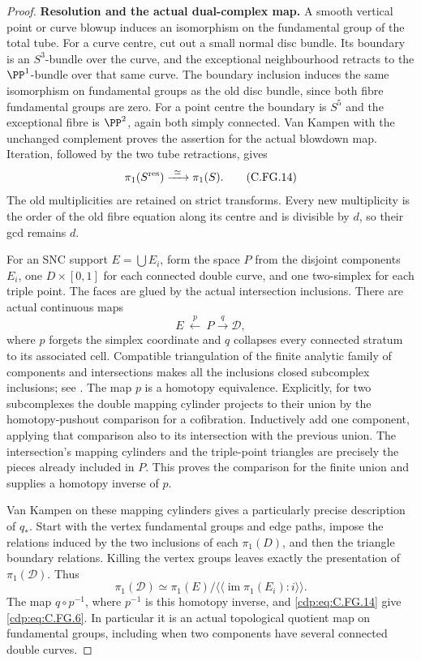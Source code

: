 \begin{proof}
\par\medskip\noindent\textbf{Resolution and the actual dual-complex map.}
A smooth vertical point or curve blowup induces an isomorphism on
the fundamental group of the total tube. For a curve centre, cut
out a small normal disc bundle. Its boundary is an $S^3$-bundle
over the curve, and the exceptional neighbourhood retracts to the
$\PP^1$-bundle over that same curve. The boundary inclusion
induces the same isomorphism on fundamental groups as the old
disc bundle, since both fibre fundamental groups are zero. For
a point centre the boundary is $S^5$ and the exceptional fibre
is $\PP^2$, again both simply connected. Van Kampen with the
unchanged complement proves the assertion for the actual blowdown
map. Iteration, followed by the two tube retractions, gives
\[
              \pi_1(S^{\rm res})\xrightarrow{\ \simeq\ }\pi_1(S).
                                                        \tag{C.FG.14}\label{cdp:eq:C.FG.14}
\]
The old multiplicities are retained on strict transforms. Every
new multiplicity is the order of the old fibre equation along its
centre and is divisible by $d$, so their gcd remains $d$.

For an SNC support $E=\bigcup E_i$, form the space $P$ from the
disjoint components $E_i$, one $D\times[0,1]$ for each connected
double curve, and one two-simplex for each triple point. The faces
are glued by the actual intersection inclusions. There are actual
continuous maps
\[
                   E\ \xleftarrow{\ p\ }\ P
                       \xrightarrow{\ q\ }\mathcal D,             
                                                        \tag{C.FG.15}\label{cdp:eq:C.FG.15}
\]
where $p$ forgets the simplex coordinate and $q$ collapses every
connected stratum to its associated cell. Compatible triangulation
of the finite analytic family of components and intersections makes
all the inclusions closed subcomplex inclusions; see
\cite[\S3, Theorem~2]{Lojasiewicz1964}. The map $p$ is a homotopy
equivalence. Explicitly, for two subcomplexes the double mapping
cylinder projects to their union by the homotopy-pushout comparison
for a cofibration. Inductively add one component, applying that
comparison also to its intersection with the previous union.
The intersection's mapping cylinders and the triple-point
triangles are precisely the pieces already included in $P$.
This proves the comparison for the finite union and supplies a
homotopy inverse of $p$.

Van Kampen on these mapping cylinders gives a particularly precise
description of $q_*$. Start with the vertex fundamental groups and
edge paths, impose the relations induced by the two inclusions of
each $\pi_1(D)$, and then the triangle boundary relations.
Killing the vertex groups leaves exactly the presentation of
$\pi_1(\mathcal D)$. Thus
\[
 \pi_1(\mathcal D)\simeq
 \pi_1(E)\big/
       \langle\!\langle\operatorname{im}\pi_1(E_i):i
                              \rangle\!\rangle .       \tag{C.FG.16}\label{cdp:eq:C.FG.16}
\]
The map $q\circ p^{-1}$, where $p^{-1}$ is this homotopy inverse,
and \eqref{cdp:eq:C.FG.14} give \eqref{cdp:eq:C.FG.6}. In particular it is an actual
topological quotient map on fundamental groups, including when
two components have several connected double curves.


\end{proof}
